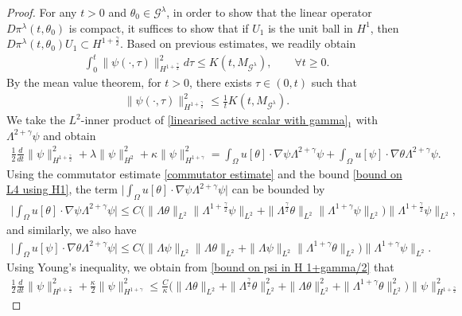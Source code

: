 \documentclass[10pt,a4paper]{amsart}
\newcommand{\Gg}{\mathcal{G}^{\lambda}}
\newcommand{\intox}{\int_{\Omega}}
\newcommand{\pin}{\pi^{\lambda}}
\begin{document}
\begin{proof}
For any $t>0$ and $\theta_0\in\Gg$, in order to show that the linear operator $D\pin(t, \theta_0)$ is compact, it suffices to show that if $U_1$ is the unit ball in $H^1$, then $D\pin(t, \theta_0)U_1\subset H^{1+\frac{\gamma}{2}}$. Based on previous estimates, we readily obtain
\begin{align*}
\int_0^t\|\psi(\cdot,\tau)\|^2_{H^{1+\frac{\gamma}{2}}}d\tau\le K(t,M_{\Gg}),\qquad\forall t\ge0.
\end{align*}
By the mean value theorem, for $t>0$, there exists $\tau\in(0,t)$ such that
\begin{align}\label{bound on psi in H 1+gamma/2}
\|\psi(\cdot,\tau)\|^2_{H^{1+\frac{\gamma}{2}}}\le \frac{1}{t}K(t,M_{\Gg}).
\end{align}
We take the $L^2$-inner product of \eqref{linearised active scalar with gamma}$_1$ with $\Lambda^{2+\gamma}\psi$ and obtain
\begin{align*}
\frac{1}{2}\frac{d}{dt}\|\psi\|^2_{H^{1+\frac{\gamma}{2}}}+\lambda\|\psi\|^2_{H^2}+\kappa\|\psi\|^2_{H^{1+\gamma}}=\intox u[\theta]\cdot \nabla \psi\Lambda^{2+\gamma}\psi+\intox u[\psi]\cdot\nabla\theta\Lambda^{2+\gamma}\psi.
\end{align*}
Using the commutator estimate \eqref{commutator estimate} and the bound \eqref{bound on L4 using H1}, the term $\Big|\intox u[\theta]\cdot \nabla \psi\Lambda^{2+\gamma}\psi\Big|$ can be bounded by
\begin{align*}
\Big|\intox u[\theta]\cdot \nabla \psi\Lambda^{2+\gamma}\psi\Big|\le C\Big(\|\Lambda\theta\|_{L^2}\|\Lambda^{1+\frac{\gamma}{2}} \psi\|_{L^2}+\|\Lambda^\frac{\gamma}{2}\theta\|_{L^2}\|\Lambda^{1+\gamma} \psi\|_{L^2}\Big)\|\Lambda^{1+\frac{\gamma}{2}} \psi\|_{L^2},
\end{align*}
and similarly, we also have
\begin{align*}
\Big|\intox u[\psi]\cdot \nabla \theta\Lambda^{2+\gamma}\psi\Big|\le C\Big(\|\Lambda \psi\|_{L^2}\|\Lambda \theta\|_{L^2}+\|\Lambda \psi\|_{L^2}\|\Lambda^{1+\gamma} \theta\|_{L^2}\Big)\|\Lambda^{1+\gamma} \psi\|_{L^2}.
\end{align*}
Using Young's inequality, we obtain from \eqref{bound on psi in H 1+gamma/2} that
\begin{align}\label{differential eqn for psi higher order}
\frac{1}{2}\frac{d}{dt}\|\psi\|^2_{H^{1+\frac{\gamma}{2}}}+\frac{\kappa}{2}\|\psi\|^2_{H^{1+\gamma}}\le \frac{C}{\kappa}\Big(\|\Lambda\theta\|_{L^2}+\|\Lambda^\frac{\gamma}{2}\theta\|^2_{L^2}+\|\Lambda\theta\|^2_{L^2}+\|\Lambda^{1+\gamma}\theta\|^2_{L^2}\Big)\|\psi\|^2_{H^{1+\frac{\gamma}{2}}}

\end{align}
\end{proof}
\end{document}
